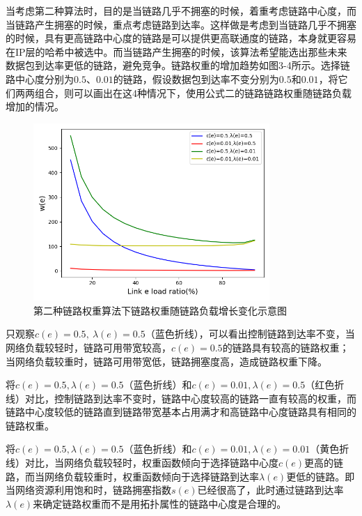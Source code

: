 当考虑第二种算法时，目的是当链路几乎不拥塞的时候，着重考虑链路中心度，而当链路产生拥塞的时候，重点考虑链路到达率。这样做是考虑到当链路几乎不拥塞的时候，具有更高链路中心度的链路是可以提供更高联通度的链路，本身就更容易在IP层的哈希中被选中。而当链路产生拥塞的时候，该算法希望能选出那些未来数据包到达率更低的链路，避免竞争。链路权重的增加趋势如图3-4所示。选择链路中心度分别为$0.5$、$0.01$的链路，假设数据包到达率不变分别为$0.5$和$0.01$，将它们两两组合，则可以画出在这4种情况下，使用公式二的链路链路权重随链路负载增加的情况。

\begin{figure}[htbp]
\setlength{\abovecaptionskip}{15pt plus 3pt minus 2pt}
\centerline{\includegraphics[width=0.8\textwidth]{./figures/ch3-link-weight-function-2.png}}
\caption{第二种链路权重算法下链路权重随链路负载增长变化示意图}
\label{fig-ch3-link-weight-function-2}
\end{figure}

只观察$c(e)=0.5,\ \lambda(e)=0.5$（蓝色折线），可以看出控制链路到达率不变，当网络负载较轻时，链路可用带宽较高，$c(e)=0.5$的链路具有较高的链路权重；当网络负载较重时，链路可用带宽低，链路拥塞度高，造成链路权重下降。

将$c(e)=0.5,\lambda(e)=0.5$（蓝色折线）和$c\left(e\right)=0.01,\lambda\left(e\right)=0.5$（红色折线）对比，控制链路到达率不变时，链路中心度较高的链路一直有较高的权重，而链路中心度较低的链路直到链路带宽基本占用满才和高链路中心度链路具有相同的链路权重。

将$c(e)=0.5,\lambda(e)=0.5$（蓝色折线）和$c\left(e\right)=0.01,\lambda\left(e\right)=0.01$（黄色折线）对比，当网络负载较轻时，权重函数倾向于选择链路中心度$c\left(e\right)$更高的链路，而当网络负载较重时，权重函数倾向于选择链路到达率$\lambda\left(e\right)$更低的链路。即当网络资源利用饱和时，链路拥塞指数$s\left(e\right)$已经很高了，此时通过链路到达率$\lambda\left(e\right)$来确定链路权重而不是用拓扑属性的链路中心度是合理的。

